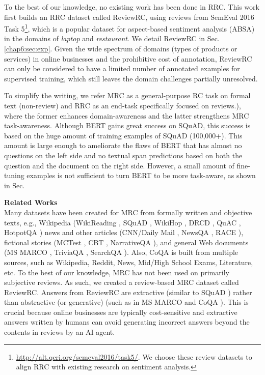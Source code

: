 To the best of our knowledge, no existing work has been done in RRC. This work first builds an RRC dataset called ReviewRC, using reviews from SemEval 2016 Task 5\footnote{\url{http://alt.qcri.org/semeval2016/task5/}. We choose these review datasets to align RRC with existing research on sentiment analysis.}, which is a popular dataset for aspect-based sentiment analysis (ABSA) \cite{hu2004mining} in the domains of \emph{laptop} and \emph{restaurant}.
We detail ReviewRC in Sec. \ref{chap6:sec:exp}.
Given the wide spectrum of domains (types of products or services) in online businesses and the prohibitive cost of annotation, ReviewRC can only be considered to have a limited number of annotated examples for supervised training, which still leaves the domain challenges partially unresolved.

To simplify the writing, we refer MRC as a general-purpose RC task on formal text (non-review) and RRC as an end-task specifically focused on reviews.), where the former enhances domain-awareness and the latter strengthens MRC task-awareness.
Although BERT gains great success on SQuAD, this success is based on the huge amount of training examples of SQuAD (100,000+).
This amount is large enough to ameliorate the flaws of BERT that has almost no questions on the left side and no textual span predictions based on both the question and the document on the right side.
However, a small amount of fine-tuning examples is not sufficient to turn BERT to be more task-aware, as shown in Sec. 

\textbf{Related Works}\\
Many datasets have been created for MRC from formally written and objective texts, e.g., Wikipedia (WikiReading \cite{hewlett2016wikireading}, SQuAD \cite{rajpurkar2016squad,rajpurkar2018know}, WikiHop \cite{welbl2018constructing}, DRCD \cite{shao2018drcd}, QuAC \cite{choi2018quac}, HotpotQA \cite{yang2018hotpotqa}) news and other articles (CNN/Daily Mail \cite{hermann2015teaching}, NewsQA \cite{trischler2016newsqa}, RACE \cite{lai2017race}), fictional stories (MCTest \cite{richardson2013mctest}, CBT \cite{hill2015goldilocks}, NarrativeQA \cite{kovcisky2018narrativeqa}), and general Web documents (MS MARCO \cite{nguyen2016ms}, TriviaQA \cite{joshi2017triviaqa}, SearchQA \cite{dunn2017searchqa} ). 
Also, CoQA \cite{reddy2018coqa} is built from multiple sources, such as Wikipedia, Reddit, News, Mid/High School Exams, Literature, etc.
To the best of our knowledge, MRC has not been used on primarily subjective reviews. As such, we created a review-based MRC dataset called ReviewRC.
Answers from ReviewRC are extractive (similar to SQuAD \cite{rajpurkar2016squad,rajpurkar2018know}) rather than abstractive (or generative) (such as in MS MARCO \cite{nguyen2016ms} and CoQA \cite{reddy2018coqa}).
This is crucial because online businesses are typically cost-sensitive and extractive answers written by humans can avoid generating incorrect answers beyond the contents in reviews by an AI agent.

